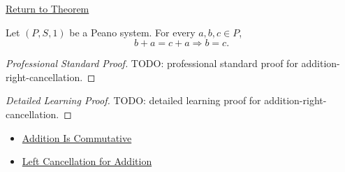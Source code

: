 \newpage
{}
\label{prf:addition-right-cancellation}

\begin{remark*}[Return]
\hyperref[thm:addition-right-cancellation]{Return to Theorem}
\end{remark*}

\begin{theorem*}
Let $(P,S,1)$ be a Peano system. For every $a,b,c \in P$,
\[
b+a=c+a
\Longrightarrow
b=c.
\]
\end{theorem*}

\begin{proof}[Professional Standard Proof]
\LRAProofBodyStart
TODO: professional standard proof for addition-right-cancellation.
\end{proof}

\begin{proof}[Detailed Learning Proof]
\LRAProofBodyStart
TODO: detailed learning proof for addition-right-cancellation.
\end{proof}

\begin{remark*}
\end{remark*}

\begin{dependencies}
\begin{itemize}
  \item \hyperref[thm:addition-commutative]{Addition Is Commutative}
  \item \hyperref[thm:addition-left-cancellation]{Left Cancellation for Addition}
\end{itemize}
\end{dependencies}

\clearpage
